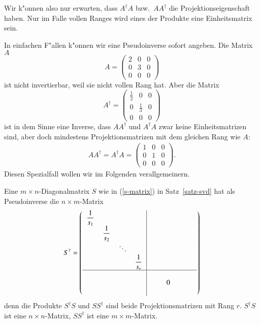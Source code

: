 Wir k"onnen also nur erwarten, dass $A^\dagger A$ bzw.~$AA^\dagger$ die
Projektionseigenschaft haben.
Nur im Falle vollen Ranges wird eines der Produkte eine Einheitsmatrix sein.

In einfachen F"allen k"onnen wir eine Pseudoinverse sofort angeben.
Die Matrix $A$
\[
A=\begin{pmatrix}
2&0&0\\
0&3&0\\
0&0&0
\end{pmatrix}
\]
ist nicht invertierbar, weil sie nicht vollen Rang hat.
Aber die Matrix
\[
A^\dagger=\begin{pmatrix}
\frac12&0&0\\
0&\frac13&0\\
0&0&0
\end{pmatrix}
\]
ist in dem Sinne eine Inverse, dass $AA^{\dagger}$ und $A^\dagger A$ zwar keine
Einheitsmatrizen sind, aber doch mindestens Projektionsmatrizen mit dem gleichen
Rang wie $A$:
\begin{align*}
AA^\dagger=A^\dagger A
=
\begin{pmatrix}
1&0&0\\
0&1&0\\
0&0&0
\end{pmatrix}.
\end{align*}
Diesen Spezialfall wollen wir im Folgenden verallgemeinern.

Eine $m\times n$-Diagonalmatrix $S$ wie in (\ref{s-matrix}) in Satz~\ref{satz-svd}
hat als Pseudoinverse die $n\times m$-Matrix
\begin{equation}
S^\dagger=\left(
\begin{tabular}{>{$\displaystyle}c<{$}>{$\displaystyle}c<{$}>{$\displaystyle}c<{$}>{$\displaystyle}c<{$}|>{$}c<{$}>{$}c<{$}>{$}c<{$}}
\frac1{s_1}&           &      &           &     &      & \\
           &\frac1{s_2}&      &           &     &      & \\
           &           &\ddots&           &     &      & \\
           &           &      &\frac1{s_r}&     &      & \\
\hline
           &           &      &           &\quad&      & \\
           &           &      &           &     &     0& \\
           &           &      &           &     &      &\qquad
\end{tabular}
\right)
\end{equation}
denn die Produkte $S^\dagger S$ und $SS^\dagger$ sind beide Projektionsmatrizen
mit Rang $r$.
$S^\dagger S$ ist eine $n\times n$-Matrix, $SS^\dagger$ ist eine
$m\times m$-Matrix.

